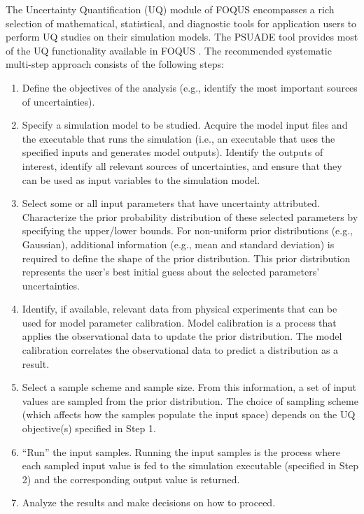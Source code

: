 The Uncertainty Quantification (UQ) module of FOQUS encompasses a rich selection of mathematical,
statistical, and diagnostic tools for application users to perform UQ
studies on their simulation models. The PSUADE tool provides most of the
UQ functionality available in FOQUS \citep{Tong_2011}. The recommended
systematic multi-step approach consists of the following steps:
\begin{enumerate}
	\item Define the objectives of the analysis (e.g., identify the most
     important sources of uncertainties).
	\item Specify a simulation model to be studied. Acquire the model input
     files and the executable that runs the simulation (i.e., an executable
     that uses the specified inputs and generates model outputs). Identify
     the outputs of interest, identify all relevant sources of
     uncertainties, and ensure that they can be used as input variables to
     the simulation model.
	\item Select some or all input parameters that have uncertainty
     attributed. Characterize the prior probability distribution of these
     selected parameters by specifying the upper/lower bounds. For
     non-uniform prior distributions (e.g., Gaussian), additional
     information (e.g., mean and standard deviation) is required to define
     the shape of the prior distribution. This prior distribution
     represents the user's best initial guess about the selected
     parameters' uncertainties.
	\item Identify, if available, relevant data from physical experiments
     that can be used for model parameter calibration. Model calibration is
     a process that applies the observational data to update the prior
     distribution. The model calibration correlates the observational data to predict a distribution as a result. 
	\item Select a sample scheme and sample size. From this information, a
     set of input values are sampled from the prior distribution. The
     choice of sampling scheme (which affects how the samples populate the
     input space) depends on the UQ objective(s) specified in Step 1.
	\item ``Run'' the input samples. Running the input samples is the
     process where each sampled input value is fed to the simulation
     executable (specified in Step 2) and the corresponding output value is
     returned.
	\item Analyze the results and make decisions on how to proceed.
\end{enumerate}

